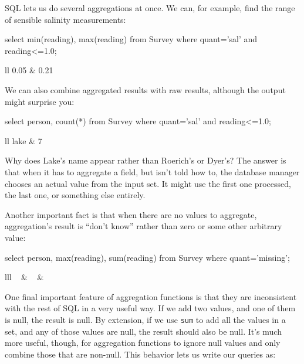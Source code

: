 SQL lets us do several aggregations at once. We can, for example, find
the range of sensible salinity measurements:

\begin{VerbIn}
select min(reading), max(reading) from Survey where quant='sal' and reading<=1.0;
\end{VerbIn}

\begin{sqltable}{ll}
0.05 & 0.21 \\
\end{sqltable}

We can also combine aggregated results with raw results, although the
output might surprise you:

\begin{VerbIn}
select person, count(*) from Survey where quant='sal' and reading<=1.0;
\end{VerbIn}

\begin{sqltable}{ll}
lake & 7 \\
\end{sqltable}

Why does Lake's name appear rather than Roerich's or Dyer's? The answer
is that when it has to aggregate a field, but isn't told how to, the
database manager chooses an actual value from the input set. It might
use the first one processed, the last one, or something else entirely.

Another important fact is that when there are no values to aggregate,
aggregation's result is ``don't know'' rather than zero or some other
arbitrary value:

\begin{VerbIn}
select person, max(reading), sum(reading) from Survey where quant='missing';
\end{VerbIn}

\begin{sqltable}{lll}
~ & ~ & ~ \\
\end{sqltable}

One final important feature of aggregation functions is that they are
inconsistent with the rest of SQL in a very useful way. If we add two
values, and one of them is null, the result is null. By extension, if we
use \texttt{sum} to add all the values in a set, and any of those values
are null, the result should also be null. It's much more useful, though,
for aggregation functions to ignore null values and only combine those
that are non-null. This behavior lets us write our queries as:

